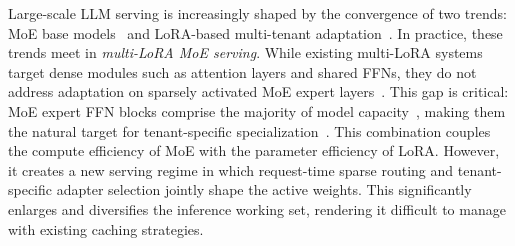 \documentclass[sigplan,anonymous,review,10pt]{acmart}
\begin{document}
Large-scale LLM serving is increasingly shaped by the convergence of two trends: MoE base models~\cite{jiang2024mixtral} and LoRA-based multi-tenant adaptation~\cite{hu2022lora,sheng2024slora}. In practice, these trends meet in \emph{multi-LoRA MoE serving}. While existing multi-LoRA systems target dense modules such as attention layers and shared FFNs, they do not address adaptation on sparsely activated MoE expert layers~\cite{chen2024punica,sheng2024slora}. This gap is critical: MoE expert FFN blocks comprise the majority of model capacity~\cite{qwen3technicalreport}, making them the natural target for tenant-specific specialization~\cite{fedus2022switch,schulman2025lora}. This combination couples the compute efficiency of MoE with the parameter efficiency of LoRA. However, it creates a new serving regime in which request-time sparse routing and tenant-specific adapter selection jointly shape the active weights. This significantly enlarges and diversifies the inference working set, rendering it difficult to manage with existing caching strategies.
%
%
\end{document}
